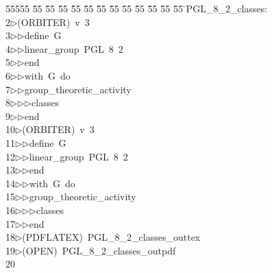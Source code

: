 %
%
\begin{tabbing}
55555 \= 55 \= 55 \= 55 \= 55 \= 55 \= 55 \= 55 \= 55 \= 55 \= 55 \= 55 \= 55 \= \>PGL\_8\_2\_classes:\\[0pt]
2\>$\triangleright$\>(ORBITER)\ v\ 3\ \\[0pt]
3\>$\triangleright$\>$\triangleright$\>define\ G\ \\[0pt]
4\>$\triangleright$\>$\triangleright$\>linear\_group\ PGL\ 8\ 2\ \\[0pt]
5\>$\triangleright$\>$\triangleright$\>end\ \\[0pt]
6\>$\triangleright$\>$\triangleright$\>with\ G\ do\ \\[0pt]
7\>$\triangleright$\>$\triangleright$\>group\_theoretic\_activity\ \\[0pt]
8\>$\triangleright$\>$\triangleright$\>$\triangleright$\>classes\ \\[0pt]
9\>$\triangleright$\>$\triangleright$\>end\\[0pt]
10\>$\triangleright$\>(ORBITER)\ v\ 3\ \\[0pt]
11\>$\triangleright$\>$\triangleright$\>define\ G\ \\[0pt]
12\>$\triangleright$\>$\triangleright$\>linear\_group\ PGL\ 8\ 2\ \\[0pt]
13\>$\triangleright$\>$\triangleright$\>end\ \\[0pt]
14\>$\triangleright$\>$\triangleright$\>with\ G\ do\ \\[0pt]
15\>$\triangleright$\>$\triangleright$\>group\_theoretic\_activity\ \\[0pt]
16\>$\triangleright$\>$\triangleright$\>$\triangleright$\>classes\ \\[0pt]
17\>$\triangleright$\>$\triangleright$\>end\\[0pt]
18\>$\triangleright$\>(PDFLATEX)\ PGL\_8\_2\_classes\_outtex\\[0pt]
19\>$\triangleright$\>(OPEN)\ PGL\_8\_2\_classes\_outpdf\\[0pt]
20\>\end{tabbing}

